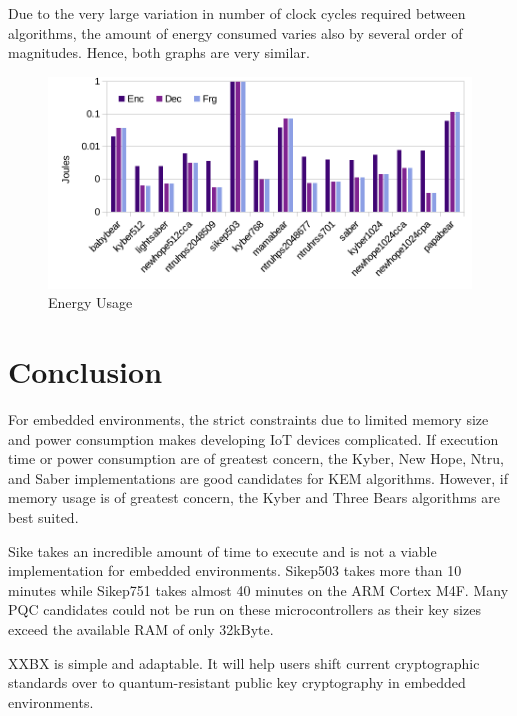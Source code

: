 \documentclass[10pt]{article}
\begin{document}
Due to the very large variation in number of clock cycles required between algorithms, 
the amount of energy consumed varies also by several order of magnitudes. Hence, both
graphs are very similar.

\begin{figure}[ht]
    \centering
    \includegraphics[scale=0.8]{./figures/energy.pdf}
    \caption{Energy Usage}
    \label{fig:energ}
\end{figure}




\section{Conclusion}

For embedded environments, the strict constraints due to limited memory size and power 
consumption makes developing IoT devices complicated. If execution time or power consumption 
are of greatest concern, the Kyber, New Hope, Ntru, and Saber implementations are good candidates 
for KEM algorithms. However, if memory usage is of greatest concern, the Kyber and Three Bears algorithms
are best suited.

Sike takes an incredible amount of time to execute and is not a viable implementation for 
embedded environments. Sikep503 takes more than 10 minutes while Sikep751 takes almost 40 minutes on the ARM Cortex M4F. 
Many PQC candidates could not be run on these microcontrollers as their key sizes exceed the
available RAM of only 32kByte.

XXBX is simple and adaptable. It will help users shift current cryptographic standards over 
to quantum-resistant public key cryptography in embedded environments.




\end{document}
